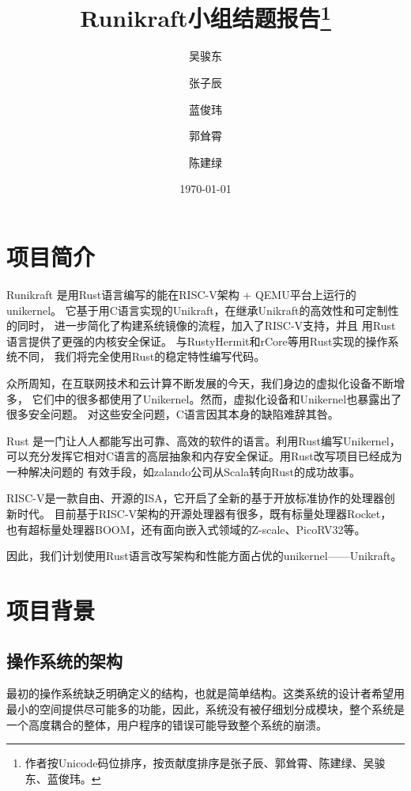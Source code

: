 \documentclass{../runikraft-report}
\begin{document}
\title{\bfseries Runikraft小组\quad 结题报告\thanks{作者按Unicode码位排序，按贡献度排序是张子辰、郭耸霄、陈建绿、吴骏东、蓝俊玮。}}
\author{吴骏东\and 张子辰\and 蓝俊玮\and 郭耸霄\and 陈建绿}
\date{\today}
\maketitle

\tableofcontents

\section{项目简介}
Runikraft 是用Rust语言编写的能在RISC-V架构 + QEMU平台上运行的unikernel。
它基于用C语言实现的Unikraft，在继承Unikraft的高效性和可定制性的同时，
进一步简化了构建系统镜像的流程，加入了RISC-V支持，并且
用Rust语言提供了更强的内核安全保证。
与RustyHermit和rCore等用Rust实现的操作系统不同，
我们将完全使用Rust的稳定特性编写代码。

众所周知，在互联网技术和云计算不断发展的今天，我们身边的虚拟化设备不断增多，
它们中的很多都使用了Unikernel。然而，虚拟化设备和Unikernel也暴露出了很多安全问题。
对这些安全问题，C语言因其本身的缺陷难辞其咎。

Rust 是一门让人人都能写出可靠、高效的软件的语言。\cite{bib:feasibility-7}利用Rust编写Unikernel，
可以充分发挥它相对C语言的高层抽象和内存安全保证。用Rust改写项目已经成为一种解决问题的
有效手段，如zalando公司从Scala转向Rust的成功故事。\cite{bib:feasibility-3}

RISC-V是一款自由、开源的ISA，它开启了全新的基于开放标准协作的处理器创新时代。\cite{bib:feasibility-0}
目前基于RISC-V架构的开源处理器有很多，既有标量处理器Rocket，
也有超标量处理器BOOM，还有面向嵌入式领域的Z-scale、PicoRV32等。\cite{bib:feasibility-2}

因此，我们计划使用Rust语言改写架构和性能方面占优的unikernel——Unikraft。

\section{项目背景}
\subsection{操作系统的架构}
最初的操作系统缺乏明确定义的结构，也就是简单结构。这类系统的设计者希望用
最小的空间提供尽可能多的功能，因此，系统没有被仔细划分成模块，整个系统是
一个高度耦合的整体，用户程序的错误可能导致整个系统的崩溃。\cite{bib:os-concept}
\end{document}
